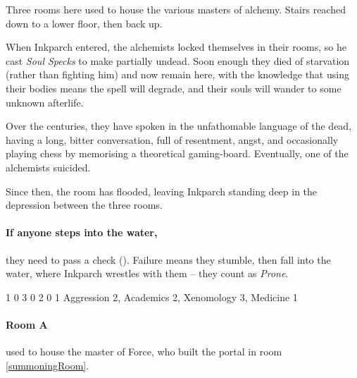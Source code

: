 \begin{exampletext}
  Three rooms here used to house the various masters of alchemy.
  Stairs reached down to a lower floor, then back up.

  When Inkparch entered, the alchemists locked themselves in their rooms, so he cast \textit{Soul Specks} to make partially undead.
  Soon enough they died of starvation (rather than fighting him) and now remain here, with the knowledge that using their bodies means the spell will degrade, and their souls will wander to some unknown afterlife.

  Over the centuries, they have spoken in the unfathomable language of the dead, having a long, bitter conversation, full of resentment, angst, and occasionally playing chess by memorising a theoretical gaming-board.
  Eventually, one of the alchemists suicided.

  Since then, the room has flooded, leaving Inkparch standing deep in the depression between the three rooms.
\end{exampletext}

\paragraph{If anyone steps into the water,}
they need to pass a  check (\tn[10]).
Failure means they stumble, then fall into the water, where Inkparch wrestles with them -- they count as \textit{Prone}.%

\setcounter{wounds}{4}

  {1}%
  {0}%
  {{3}%
  {0}%
  {2}}%
  {0}%
  {1}%
  {
    Aggression 2, Academics 2, Xenomology 3, Medicine 1
  }%
  {\longsword}%
  {
    \addtocounter{xpbonus}{3}
    \setcounter{Brawl}{2}
    \setcounter{Academics}{3}
    \setcounter{Xenomology}{2}
    \setcounter{Medicine}{1}
    \setcounter{Stealth}{1}
    \setcounter{Air}{3}
    \setcounter{Earth}{2}
    \setcounter{Fire}{2}
    \undead
  }

\showStdSpells


\showStdSpells

\paragraph{Room A} used to house the master of Force, who built the portal in room \ref{summoningRoom}.

